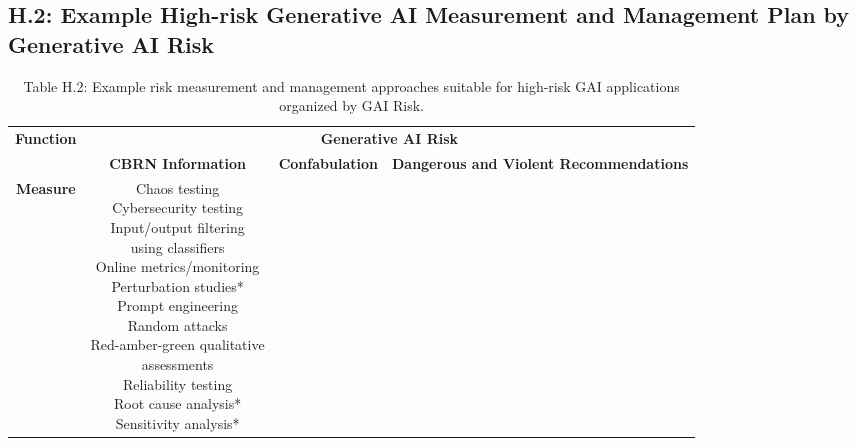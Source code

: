 \documentclass[fleqn]{article}
\begin{document}
\subsection*{H.2: Example High-risk Generative AI Measurement and Management Plan by Generative AI Risk}\label{appdxh2}

\begin{table}[H]
	\caption*{Table H.2: Example risk measurement and management approaches suitable for high-risk GAI applications organized by GAI Risk.}
	\footnotesize
	\begin{tabular}{|c|c|c|c|}
		\hline
		\multirow{2}{*}{\textbf{Function}} & \multicolumn{3}{|c|}{\textbf{Generative AI Risk}}   \\
		\cline{2-4}
		& \textbf{CBRN Information} & \textbf{Confabulation} & \textbf{Dangerous and Violent Recommendations} \\
		\hline	
		\textbf{Measure} & 
		\makecell[l]{	
			\textbullet\hspace{3pt} Chaos testing\\ 	
			\textbullet\hspace{3pt} Cybersecurity testing\\ 	
			\textbullet\hspace{3pt} Input/output filtering\\\hspace{10pt}using classifiers\\ 	
			\textbullet\hspace{3pt} Online metrics/monitoring\\ 	
			\textbullet\hspace{3pt} Perturbation studies*\\ 	
			\textbullet\hspace{3pt} Prompt engineering\\ 	
			\textbullet\hspace{3pt} Random attacks\\ 	
			\textbullet\hspace{3pt} Red-amber-green qualitative\\\hspace{10pt}assessments\\ 	
			\textbullet\hspace{3pt} Reliability testing\\ 	
			\textbullet\hspace{3pt} Root cause analysis*\\ 	
			\textbullet\hspace{3pt} Sensitivity analysis*\\ 	
}
\end{tabular}
\end{table}
\end{document}
